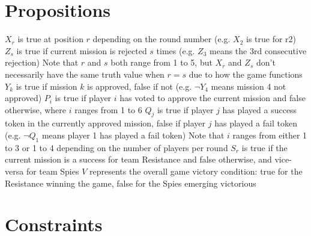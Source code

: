 \documentclass[pdftex,10pt,a4paper]{article}
\numberwithin{equation}{section} %
\begin{document}
\section*{Propositions}
$X_r$ is true at position $r$ depending on the round number (e.g. $X_2$ is true for r2)\newline
$Z_s$ is true if current mission is rejected $s$ times (e.g. $Z_3$ means the 3rd consecutive rejection) \newline
Note that $r$ and $s$ both range from 1 to 5, but $X_r$ and $Z_s$ don't necessarily have the same truth value when $r=s$ due to how the game functions\newline
$Y_k$ is true if mission $k$ is approved, false if not (e.g. $\neg Y_4$ means mission 4 not approved) \newline
$P_i$ is true if player $i$ has voted to approve the current mission and false otherwise, where $i$ ranges from 1 to 6 \newline
$Q_j$ is true if player $j$ has played a success token in the currently approved mission, false if player $j$ has played a fail token (e.g. $\neg Q_1$ means player 1 has played a fail token) \newline
Note that $i$ ranges from either 1 to 3 or 1 to 4 depending on the number of players per round \newline
$S_r$ is true if the current mission is a success for team Resistance and false otherwise, and vice-versa for team Spies \newline
$V$ represents the overall game victory condition: true for the Resistance winning the game, false for the Spies emerging victorious\newline

\section*{Constraints}
\end{document}

